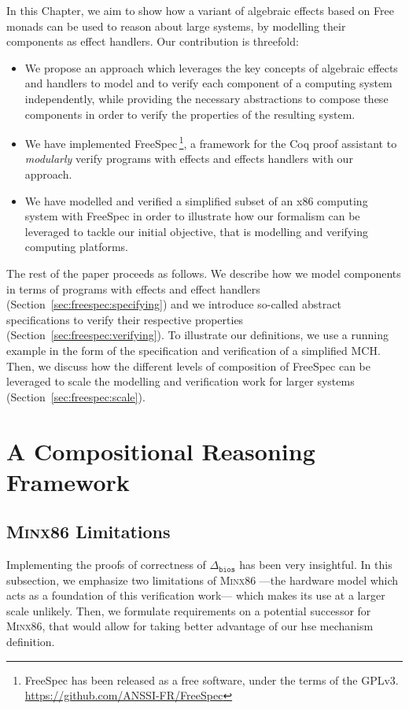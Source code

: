 In this Chapter, we aim to show how a variant of algebraic effects based on Free
monads can be used to reason about large systems, by modelling their components
as effect handlers.
%
Our contribution is threefold:
\begin{itemize}
\item We propose an approach which leverages the key concepts of algebraic
  effects and handlers to model and to verify each component of a computing
  system independently, while providing the necessary abstractions to compose
  these components in order to verify the properties of the resulting system.
%
\item We have implemented FreeSpec\,\footnote{FreeSpec has been released as a
    free software, under the terms of the GPLv3.
    \url{https://github.com/ANSSI-FR/FreeSpec}}, a framework for the Coq proof
  assistant to \emph{modularly} verify programs with effects and effects
  handlers with our approach.
%
\item We have modelled and verified a simplified subset of an x86 computing
  system with FreeSpec in order to illustrate how our formalism can be leveraged
  to tackle our initial objective, that is modelling and verifying computing
  platforms.
\end{itemize}

The rest of the paper proceeds as follows.
%
We describe how we model components in terms of programs with effects and effect
handlers (Section~\ref{sec:freespec:specifying}) and we introduce so-called
abstract specifications to verify their respective properties
(Section~\ref{sec:freespec:verifying}).
%
To illustrate our definitions, we use a running example in the form of the
specification and verification of a simplified MCH.
%
Then, we discuss how the different levels of composition of FreeSpec can be
leveraged to scale the modelling and verification work for larger systems
(Section~\ref{sec:freespec:scale}).

\section{A Compositional Reasoning Framework}

\subsection{{\scshape Minx86} Limitations}

Implementing the proofs of correctness of \( \Delta_{\mathtt{bios}} \) has been
very insightful.
%
In this subsection, we emphasize two limitations of {\scshape Minx86} ---the
hardware model which acts as a foundation of this verification work--- which
makes its use at a larger scale unlikely.
%
Then, we formulate requirements on a potential successor for {\scshape Minx86},
that would allow for taking better advantage of our \ac{hse} mechanism
definition.

